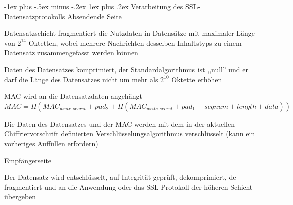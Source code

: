 \documentclass[a4paper]{article}
\makeatletter
\renewcommand{\subsubsection}{\@startsection{subsubsection}{3}{0mm}%
 {-1ex plus -.5ex minus -.2ex}%
 {1ex plus .2ex}%
 {\normalfont\small\bfseries}}
\makeatother
\begin{document}
\begin{multicols}{3}
      \subsubsection{Verarbeitung des SSL-Datensatzprotokolls}
      Absendende Seite
      \begin{enumerate*}
            \item Datensatzschicht fragmentiert die Nutzdaten in Datensätze mit maximaler Länge von $2^{14}$ Oktetten, wobei mehrere Nachrichten desselben Inhaltstyps zu einem Datensatz zusammengefasst werden können
            \item Daten des Datensatzes komprimiert, der Standardalgorithmus ist ,,null'' und er darf die Länge des Datensatzes nicht um mehr als $2^{10}$ Oktette erhöhen
            \item MAC wird an die Datensatzdaten angehängt $MAC = H(MAC_{write\_secret} + pad_2 + H(MAC_{write\_secret} + pad_1 + seqnum + length + data))$
            \item Die Daten des Datensatzes und der MAC werden mit dem in der aktuellen Chiffriervorschrift definierten Verschlüsselungsalgorithmus verschlüsselt (kann ein vorheriges Auffüllen erfordern)
      \end{enumerate*}

      Empfängerseite
      \begin{itemize*}
            \item Der Datensatz wird entschlüsselt, auf Integrität geprüft, dekomprimiert, de-fragmentiert und an die Anwendung oder das SSL-Protokoll der höheren Schicht übergeben
      \end{itemize*}


\end{multicols}
\end{document}
